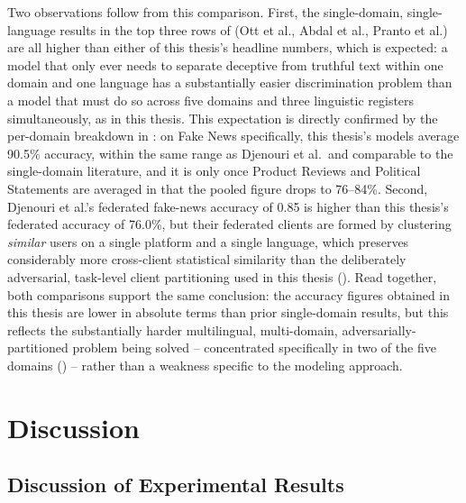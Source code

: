 Two observations follow from this comparison. First, the single-domain, single-language results in the top three rows of  (Ott et al., Abdal et al., Pranto et al.) are all higher than either of this thesis's headline numbers, which is expected: a model that only ever needs to separate deceptive from truthful text within one domain and one language has a substantially easier discrimination problem than a model that must do so across five domains and three linguistic registers simultaneously, as in this thesis. This expectation is directly confirmed by the per-domain breakdown in : on Fake News specifically, this thesis's models average 90.5\% accuracy, within the same range as Djenouri et al.\ and comparable to the single-domain literature, and it is only once Product Reviews and Political Statements are averaged in that the pooled figure drops to 76--84\%. Second, Djenouri et al.'s \cite{djenouri2024federated} federated fake-news accuracy of 0.85 is higher than this thesis's federated accuracy of 76.0\%, but their federated clients are formed by clustering \emph{similar} users on a single platform and a single language, which preserves considerably more cross-client statistical similarity than the deliberately adversarial, task-level client partitioning used in this thesis (). Read together, both comparisons support the same conclusion: the accuracy figures obtained in this thesis are lower in absolute terms than prior single-domain results, but this reflects the substantially harder multilingual, multi-domain, adversarially-partitioned problem being solved -- concentrated specifically in two of the five domains () -- rather than a weakness specific to the modeling approach.

\section{Discussion}
\label{sec:discussion}

\subsection{Discussion of Experimental Results}

